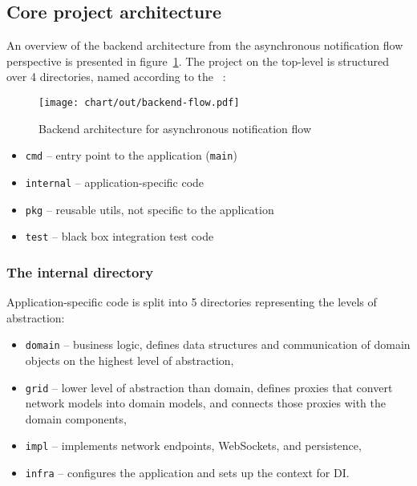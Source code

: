\subsection{Core project architecture}\label{sec:core-project-architecture}

An overview of the backend architecture
from the asynchronous notification flow perspective
is presented in figure~\ref{fig:high-level-backend-flow}.
The project on the top-level is structured over 4 directories,
named according to
the ~\cite{quest_standard_2022}:

\begin{figure}[h]
      \centering
      \texttt{[image: chart/out/backend-flow.pdf]}
      \caption{Backend architecture for asynchronous notification flow}
      \label{fig:high-level-backend-flow}
\end{figure}

\begin{itemize}
      \item
            \texttt{cmd} -- entry point to the application (\texttt{main})
      \item
            \texttt{internal} -- application-specific code
      \item
            \texttt{pkg} -- reusable utils, not specific to the application
      \item
            \texttt{test} -- black box integration test code
\end{itemize}

\subsubsection{The internal directory}\label{sec:the-internal-directory}

Application-specific code is split into 5 directories
representing the levels of abstraction:

\begin{itemize}
      \item
            \texttt{domain} -- business logic,
            defines data structures and communication of domain objects
            on the highest level of abstraction,
      \item
            \texttt{grid} -- lower level of abstraction than domain,
            defines proxies that convert network models into domain models,
            and connects those proxies with the domain components,
      \item
            \texttt{impl} -- implements network endpoints,
            WebSockets, and persistence,
      \item
            \texttt{infra} -- configures the application
            and sets up the context for DI.
\end{itemize}

